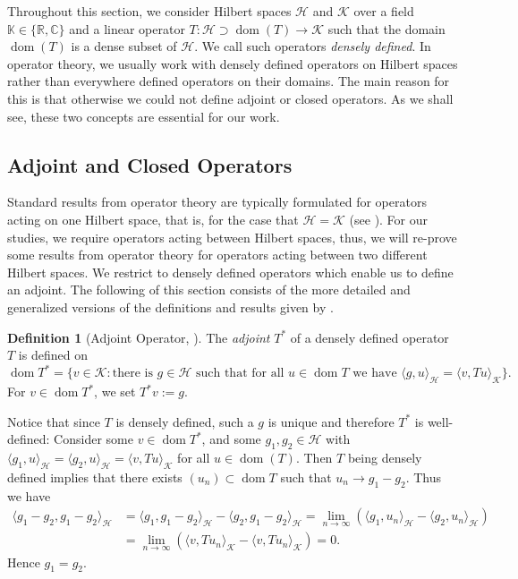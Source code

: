 \documentclass[11pt]{article}
\theoremstyle{definition}
\newtheorem{definition}[theorem]{Definition}
\theoremstyle{remark}
\DeclareMathOperator\dom{dom}
\newcommand{\Hh}{\mathcal{H}}
\newcommand{\Kk}{\mathcal{K}}
\newcommand{\R}{\mathbb{R}}
\newcommand{\IK}{\mathbb{K}}
\newcommand{\IC}{\mathbb{C}}
\begin{document}
Throughout this section, we consider Hilbert spaces $\Hh$ and $\Kk$ over a field $\IK \in \{\R,\IC\}$ and a linear operator $T: \Hh \supset \dom(T) \rightarrow \Kk$ such that the domain $\dom(T)$ is a dense subset of $\Hh$. We call such operators \textit{densely defined}. In operator theory, we usually work with densely defined operators on Hilbert spaces rather than everywhere defined operators on their domains. The main reason for this is that otherwise we could not define adjoint or closed operators. As we shall see, these two concepts are essential for our work.

\subsection{Adjoint and Closed Operators}

Standard results from operator theory are typically formulated for operators acting on one Hilbert space, that is, for the case that $\Hh=\Kk$ (see \citet{schroedingerop}). For our studies, we require operators acting between Hilbert spaces, thus, we will re-prove some results from operator theory for operators acting between two different Hilbert spaces. We restrict to densely defined operators which enable us to define an adjoint. The following of this section consists of the more detailed and generalized versions of the definitions and results given by \citet[p.~12]{schroedingerop}.

\begin{definition}[Adjoint Operator, \citet{schroedingerop}]
    The \emph{adjoint} $T^*$ of a densely defined operator $T$ is defined on
$$
    \dom T^*=\{ v\in \mathcal{K}:\text{there is } g \in \mathcal{H} \text{ such that for all } u\in \dom T \text{ we have }\langle g,u\rangle_\mathcal{H}=\langle v,Tu\rangle_\mathcal{K}\}.
$$
For $v\in \dom T^*$, we set $T^*v:=g$.
\end{definition}

Notice that since $T$ is densely defined, such a $g$ is unique and therefore $T^*$ is well-defined: Consider some $v\in \dom T^*$, and some $g_1,g_2\in \mathcal{H}$ with $\langle g_1,u\rangle_\mathcal{H}=\langle g_2,u\rangle_\mathcal{H}=\langle v,Tu\rangle_\mathcal{K}$ for all $u \in \dom(T)$. Then $T$ being densely defined implies that there exists $(u_n)\subset \dom T$ such that $u_n\to g_1-g_2$. Thus we have
\begin{align*}
    \langle g_1-g_2,g_1-g_2\rangle_\mathcal{H}&=\langle g_1,g_1-g_2\rangle_\mathcal{H}-\langle g_2,g_1-g_2\rangle_\mathcal{H}=\lim_{n\to\infty}(\langle g_1,u_n\rangle_\mathcal{H}-\langle g_2,u_n\rangle_\mathcal{H})\\
    &=\lim_{n\to\infty}(\langle v,Tu_n\rangle_\mathcal{K}-\langle v,Tu_n\rangle_\mathcal{K})=0.
\end{align*}
Hence $g_1=g_2$.
\end{document}
